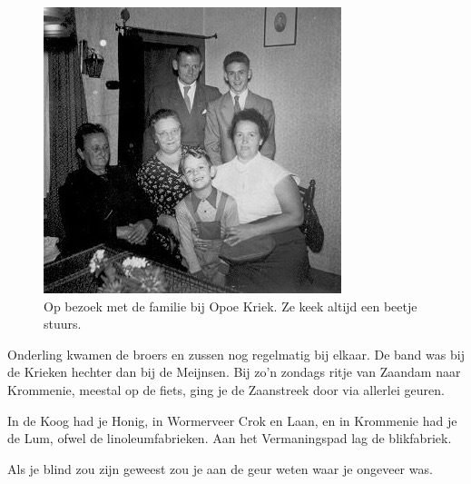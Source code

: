 \documentclass[12pt,twoside]{memoir}
\begin{document}
\begin{figure}
\includegraphics[width=\textwidth]{img/ch3/opbezoek}
\caption*{\footnotesize Op bezoek met de familie bij Opoe Kriek. Ze keek altijd een beetje stuurs.}
\end{figure}

Onderling kwamen de broers en zussen nog regelmatig bij elkaar. De band was bij de Krieken hechter dan bij de Meijnsen. Bij zo’n zondags ritje van Zaandam naar Krommenie, meestal op de fiets, ging je de Zaanstreek door via allerlei geuren. 

In de Koog had je Honig, in Wormerveer Crok en Laan, en in Krommenie had je de Lum, ofwel de linoleumfabrieken. Aan het Vermaningspad lag de blikfabriek. 

Als je blind zou zijn geweest zou je aan de geur weten waar je ongeveer was. 
\end{document}
